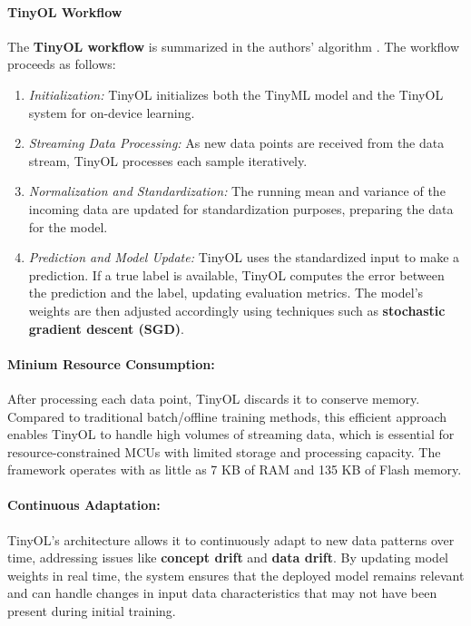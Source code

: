\documentclass[twocolumn]{article}
\begin{document}
\paragraph{TinyOL Workflow}
The \textbf{TinyOL workflow} is summarized in the authors' algorithm \cite{ren_tinyol_2021}. The workflow proceeds as follows:
\begin{enumerate}
    \item \textit{Initialization:} TinyOL initializes both the TinyML model and the TinyOL system for on-device learning.
    \item \textit{Streaming Data Processing:} As new data points are received from the data stream, TinyOL processes each sample iteratively.
    \item \textit{Normalization and Standardization:} The running mean and variance of the incoming data are updated for standardization purposes, preparing the data for the model.
    \item \textit{Prediction and Model Update:} TinyOL uses the standardized input to make a prediction. If a true label is available, TinyOL computes the error between the prediction and the label, updating evaluation metrics. The model’s weights are then adjusted accordingly using techniques such as \textbf{stochastic gradient descent (SGD)}.
\end{enumerate}

\paragraph{Minium Resource Consumption:}
After processing each data point, TinyOL discards it to conserve memory. Compared to traditional batch/offline training methods, this efficient approach enables TinyOL to handle high volumes of streaming data, which is essential for resource-constrained MCUs with limited storage and processing capacity. The framework operates with as little as 7 KB of RAM and 135 KB of Flash memory.

\paragraph{Continuous Adaptation:}
TinyOL’s architecture allows it to continuously adapt to new data patterns over time, addressing issues like \textbf{concept drift} and \textbf{data drift}. By updating model weights in real time, the system ensures that the deployed model remains relevant and can handle changes in input data characteristics that may not have been present during initial training.
\end{document}
